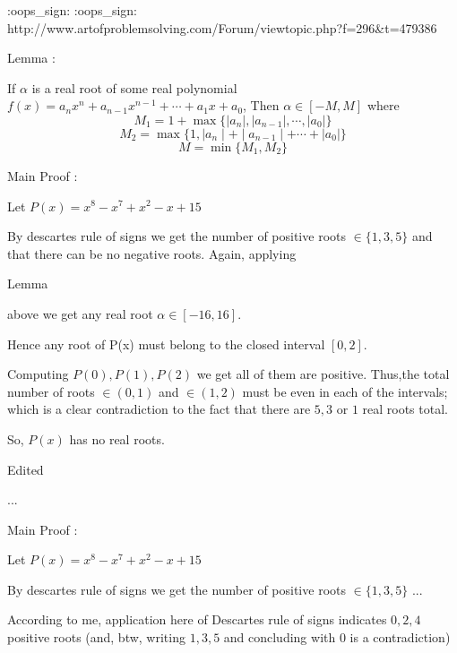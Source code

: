 \begin{solution}
	:oops_sign:  :oops_sign: 
http://www.artofproblemsolving.com/Forum/viewtopic.php?f=296&t=479386
\end{solution}



\begin{solution}
	\begin{bolded}Lemma :\end{bolded} If $\alpha$ is a real root of some real polynomial $f(x)=a_nx^n+a_{n-1}x^{n-1}+\cdots+a_1x+a_0$,
Then $\alpha\in\left[-M,M\right]$ where \[M_1=1+\max\{\mid a_n\mid,\mid a_{n-1}\mid,\cdots,\mid a_0\mid\}\] \[M_2=\max\{1,\mid a_n\mid +\mid a_{n-1}\mid +\cdots+\mid a_0\mid\}\]
\[M=\min\{M_1,M_2\}\]

\begin{bolded} Main Proof :\end{bolded} Let $P(x)=x^8-x^7+x^2-x+15$

By descartes rule of signs we get the number of positive roots $\in\{1,3,5\}$ and that there can be no negative roots.
Again, applying \begin{italicized}Lemma\end{italicized} above we get any real root $\alpha\in\left[-16,16\right]$.

Hence any root of P(x) must belong to the closed interval $\left[0,2\right]$.

Computing $P(0), P(1), P(2)$ we get all of them are positive.
Thus,the total number of roots $\in\left( 0,1\right)$ and $\in\left( 1,2\right)$ must be even in each of the intervals;
which is a clear contradiction to the fact that there are $5,3$ or $1$ real roots total.

So, $P(x)$ has no real roots.

Edited
\end{solution}



\begin{solution}
	\begin{tcolorbox}...
\begin{bolded} Main Proof :\end{bolded} Let $P(x)=x^8-x^7+x^2-x+15$

By descartes rule of signs we get the number of positive roots $\in\{1,3,5\}$
...\end{tcolorbox}
According to me, application here of Descartes rule of signs indicates $0,2,4$ positive roots
(and, btw, writing $1,3,5$ and concluding with $0$ is a contradiction)
\end{solution}



